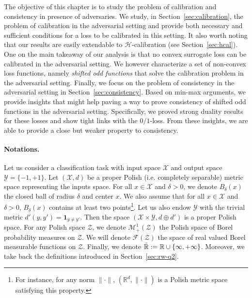 




The objective of this chapter is to study the problem of calibration and consistency in presence of adversaries. We study, in Section~\ref{sec:calibration}, the problem of calibration in the adversarial setting and provide both necessary and sufficient conditions for a loss to be calibrated in this setting. It also worth noting that our results are easily extendable to  $\mathcal{H}$-calibration (see Section~\ref{sec:hcal}). One on the main takeaway of our analysis is that  no convex surrogate loss can be calibrated in the adversarial setting. We however characterize a set of non-convex loss functions, namely \emph{shifted odd functions} that solve the calibration problem in the adversarial setting. Finally, we focus on the problem of consistency in the adversarial setting in Section~\ref{sec:consistency}. Based on min-max arguments, we provide insights that might help paving a way to prove consistency of shifted odd functions in the adversarial setting. Specifically, we proved strong duality results for these losses and show tight links with the $0/1$-loss. From these insights, we are able to provide a close but weaker property to consistency.

\paragraph{Notations.} Let us consider a classification task with input space $\mathcal{X}$ and output space $\mathcal{Y}=\{-1,+1\}$. Let $(\mathcal{X},d)$ be a proper Polish (i.e. completely separable) metric space representing the inputs space. For all $x\in\mathcal{X}$ and $\delta>0$, we denote $B_\delta(x)$ the closed ball of radius $\delta$ and center $x$. We also assume that for all $x\in\mathcal{X}$ and $\delta>0$,  $B_\delta(x)$ contains at least two points\footnote{For instance, for any norm $\lVert\cdot\rVert$,  $(\mathbb{R}^d,\lVert \cdot \rVert)$ is a Polish metric space satisfying this property.}. Let us also endow $\mathcal{Y}$ with the trivial metric  $d'(y,y') = \mathbf{1}_{y\neq y'}$. Then the space $(\mathcal{X}\times\mathcal{Y},d\oplus d')$ is a proper Polish space. For any Polish space $\mathcal{Z}$, we denote $\mathcal{M}_+^1(\mathcal{Z})$ the Polish space of Borel probability measures on $\mathcal{Z}$. We will denote $\mathcal{F}(\mathcal{Z})$ the space of real valued Borel measurable functions on $\mathcal{Z}$. Finally, we denote $\bar{\mathbb{R}}:=\mathbb{R}\cup\{\-\infty,+\infty\}$. Moreover, we take back the definitions introduced in Section~\ref{sec:rw-q2}.








